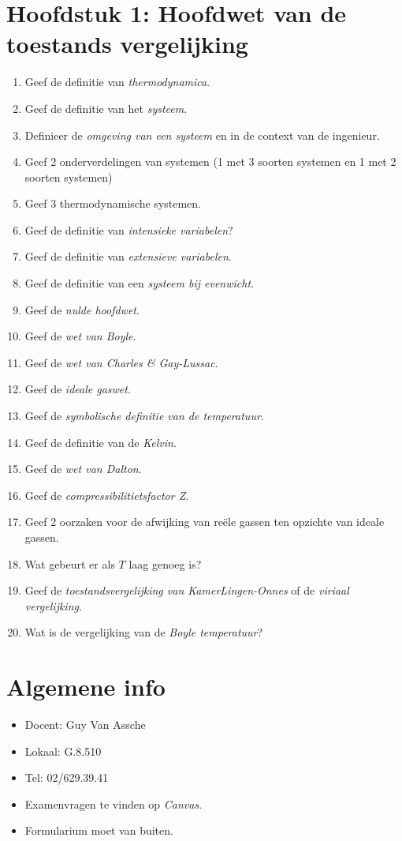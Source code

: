 \documentclass[12pt]{article}
\begin{document}
    \maketitle

	\section{Hoofdstuk 1: Hoofdwet van de toestands vergelijking}%
	\label{sec:Hoofdstuk_1}
	\begin{enumerate}
		\item Geef de definitie van \emph{thermodynamica}.
		\item Geef de definitie van het \emph{systeem}.
		\item Definieer de \emph{omgeving van een systeem} en in de context van de ingenieur.
		\item Geef 2 onderverdelingen van systemen (1 met 3 soorten systemen en 1 met 2 soorten systemen)
		\item Geef 3 thermodynamische systemen.
		\item Geef de definitie van \emph{intensieke variabelen}?
		\item Geef de definitie van \emph{extensieve variabelen}.
		\item Geef de definitie van een \emph{systeem bij evenwicht}.
		\item Geef de \emph{nulde hoofdwet}.
		\item Geef de \emph{wet van Boyle}.
		\item Geef de \emph{wet van Charles \& Gay-Lussac}.
		\item Geef de \emph{ideale gaswet}.
		\item Geef de \emph{symbolische definitie van de temperatuur}.
		\item Geef de definitie van de \emph{Kelvin}.
		\item Geef de \emph{wet van Dalton}.
		\item Geef de \emph{compressibilitietsfactor Z}.
		\item Geef 2 oorzaken voor de afwijking van re\"ele gassen ten opzichte van ideale gassen.
		\item Wat gebeurt er als $T$ laag genoeg is?
		\item Geef de \emph{toestandsvergelijking van KamerLingen-Onnes} of de \emph{viriaal vergelijking}.
		\item Wat is de vergelijking van de \emph{Boyle temperatuur}?
	\end{enumerate}

    \section{Algemene info}%
    \label{sec:Algemene_info}
    \begin{itemize}
    	\item Docent: Guy Van Assche
		\item Lokaal: G.8.510
		\item Tel: 02/629.39.41
		\item Examenvragen te vinden op \emph{Canvas}.
		\item Formularium moet van buiten.
    \end{itemize}
\end{document}
